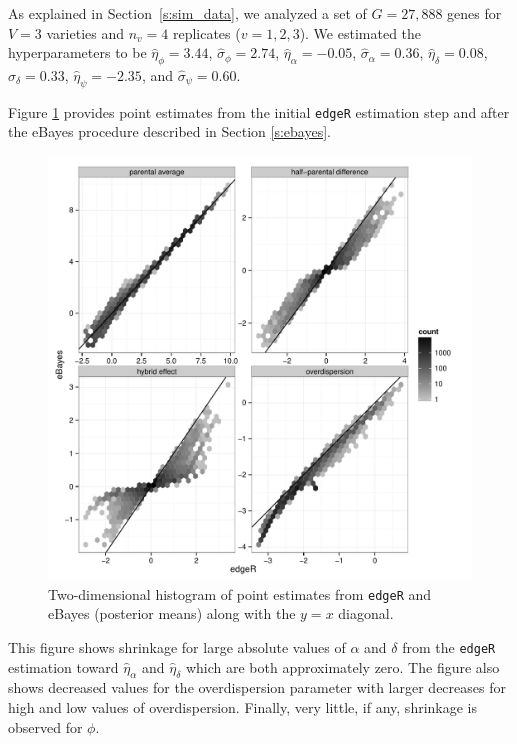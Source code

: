 \documentclass[useAMS,usenatbib,referee]{biom}
\newcommand{\edgeR}{{\tt edgeR}}
\begin{document}
As explained in Section~\ref{s:sim_data}, we analyzed a set of $G=27,888$ genes for $V=3$ varieties and $n_v=4$ replicates ($v=1,2,3$). We estimated the hyperparameters to be $\hat{\eta}_\phi = 3.44$, $\hat{\sigma}_\phi = 2.74$, $\hat{\eta}_\alpha = -0.05$, $\hat{\sigma}_\alpha=0.36$, $\hat{\eta}_\delta = 0.08$, $\hat{\sigma}_\delta=0.33$, $\hat{\eta}_\psi = -2.35$, and $\hat{\sigma}_\psi=0.60$. 

Figure \ref{f:gene_specific_estimates} provides point estimates from the initial \edgeR{} estimation step and after the eBayes procedure described in Section \ref{s:ebayes}. 
\begin{figure}
\centerline{\includegraphics[width=\textwidth]{gene_specific_estimates.pdf}}
\caption{Two-dimensional histogram of point estimates from \edgeR{} and eBayes (posterior means) along with the $y=x$ diagonal.}
\label{f:gene_specific_estimates}
\end{figure}
This figure shows shrinkage for large absolute values of $\alpha$ and $\delta$ from the \edgeR{} estimation toward $\hat{\eta}_\alpha$ and $\hat{\eta}_\delta$ which are both approximately zero. The figure also shows decreased values for the overdispersion parameter with larger decreases for high and low values of overdispersion. Finally, very little, if any, shrinkage is observed for $\phi$. 
\end{document}
